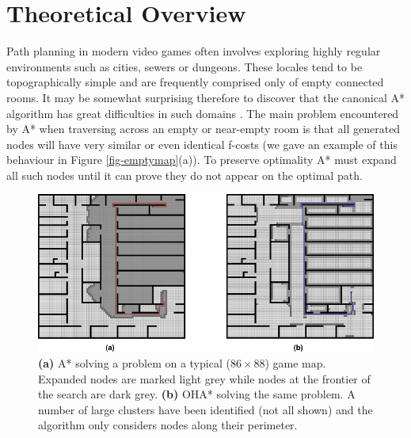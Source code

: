 \section{Theoretical Overview}
\label{algorithm}
Path planning in modern video games often involves exploring highly regular 
environments such as cities, sewers or dungeons.
These locales tend to be topographically simple and are frequently comprised only
of empty connected rooms.
It may be somewhat surprising therefore to discover that the canonical A* 
algorithm\cite{hart68} has great difficulties in such domains .
The main problem encountered by A* when traversing across an empty or near-empty 
room is that all generated nodes will have very similar or even identical f-costs
(we gave an example of this behaviour in Figure \ref{fig-emptymap}(a)).
To preserve optimality A* must expand all such nodes until it can prove they do 
not appear on the optimal path.
\begin{figure}[htbp]
	\label{fig-oha_contrast}
	\vspace{-4pt}
       \begin{center}
           \includegraphics[scale=0.60, trim = 10mm 10mm 10mm 0mm]{diagrams/oha_contrast.png}
       \end{center}
	\vspace{-3pt}
       \caption{\textbf{(a)} A* solving a problem on a typical ($86\times88$) game map. 
Expanded nodes are marked light grey while nodes at the frontier of the search are dark grey.
\textbf{(b)} OHA* solving the same problem. A number of large clusters have been identified (not
all shown) and the algorithm only considers nodes along their perimeter.}
       \label{fig-ohacontrast}
	\vspace{-15pt}
\end{figure}

